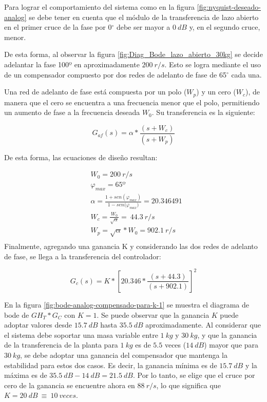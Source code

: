 Para lograr el comportamiento del sistema como en la figura 	\ref{fig:nyquist-deseado-analog} se debe tener en cuenta que el m\'{o}dulo de la transferencia de lazo abierto en el primer cruce de la fase por 0$\mathrm{{}^\circ}$ debe ser mayor a $0\:dB$ y, en el segundo cruce, menor. 

De esta forma, al observar la figura \ref{fig:Diag_Bode_lazo_abierto_30kg} se decide adelantar la fase 100º en aproximadamente $200\:r/s$. Esto se logra mediante el uso de un compensador compuesto por dos redes de adelanto de fase de 65$\mathrm{{}^\circ}$ cada una. 

Una red de adelanto de fase está compuesta por un polo ($W_p$) y un cero ($W_c$), de manera que el cero se encuentra a una frecuencia menor que el polo, permitiendo un aumento de fase a la frecuencia deseada $W_0$. Su transferencia es la siguiente:

\begin{equation}
	G_{af}(s)=\alpha*\frac{(s + W_c)}{(s + W_p)}
\end{equation}

\noindent De esta forma, las ecuaciones de dise\~{n}o resultan:

\begin{equation*}
	\begin{aligned}
		&W_0 =200\:r/s\\
		&{\varphi }_{max} =65\textrm{º}\\
		&\alpha =\frac{1+sen({\varphi }_{max})}{1-sen{(\varphi }_{max})}=20.346491\\
		&W_c =\frac{W_0}{\sqrt{\alpha }}=\ 44.3\:r/s\\
		&W_p =\sqrt{\alpha }*W_0=902.1\: r/s\\
	\end{aligned}
\end{equation*} 
\noindent Finalmente, agregando una ganancia K y considerando las dos redes de adelanto de fase, se llega a la transferencia del controlador:

\begin{equation}  
	G_c(s)=K*{[20.346*\frac{(s+44.3)}{(s+902.1)}]}^2
\end{equation} 

\noindent En la figura \ref{fig:bode-analog-compensado-para-k-1} se muestra el diagrama de bode de ${GH}_T*G_C$ con $K=1$. Se puede observar que la ganancia $K$ puede adoptar valores desde $15.7\:dB$ hasta $35.5\:dB$ aproximadamente. Al considerar que el sistema debe soportar una masa variable entre $1\:kg$ y $30\:kg$, y que la ganancia de la transferencia de la planta para $1\:kg$ es de $5.5$ veces ($14\:dB$) mayor que para $30\:kg$, se debe adoptar una ganancia del compensador que mantenga la estabilidad para estos dos casos. Es decir, la ganancia m\'{i}nima es de $15.7\:dB$ y la m\'{a}xima es de $35.5\:dB - 14\:dB = 21.5\:dB$. Por lo tanto, se elige que el cruce por cero de la ganancia se encuentre ahora en $88\:r/s$, lo que significa que $K=20\:dB\ \equiv \ 10\: veces$.



